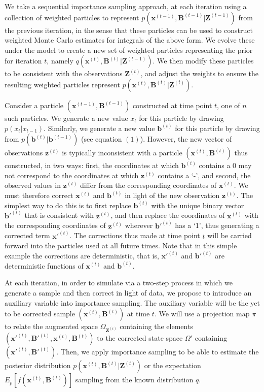 \documentclass[11pt,a4paper]{article}
\renewcommand{\vec}[1]{\mathbf{#1}}
\begin{document}
We take a sequential importance sampling approach, at each iteration using a collection of weighted particles to represent $p(\vec{x}^{(t-1)}, \vec{B}^{(t-1)} | \vec{Z}^{(t-1)})$ from the previous iteration, in the sense that these particles can be used to construct weighted Monte Carlo estimates for integrals of the above form. We evolve these under the model to create a new set of weighted particles representing the prior for iteration $t$, namely $q(\vec{x}^{(t)}, \vec{B}^{(t)} | \vec{Z}^{(t-1)})$. We then modify these particles to be consistent with the observations $\vec{Z}^{(t)}$, and adjust the weights to ensure the resulting weighted particles represent $p(\vec{x}^{(t)}, \vec{B}^{(t)} | \vec{Z}^{(t)})$.

Consider a particle $(\vec{x}^{(t-1)},\vec{B}^{(t-1)})$ constructed at time point $t$, one of $n$ such particles. We generate a new value $x_t$ for this particle by drawing $p(x_t | x_{t-1})$. Similarly, we generate a new value $\vec{b}^{(t)}$ for this particle by drawing from $p(\vec{b}^{(t)} | \vec{b}^{(t-1)})$ (see equation $(1)$). However, the new vector of observations $\vec{z}^{(t)}$ is typically inconsistent with a particle $(\vec{x}^{(t)}, \vec{B}^{(t)})$ thus constructed, in two ways: first, the coordinates at which $\vec{b}^{(t)}$ contains a 0 may not correspond to the coordinates at which $\vec{z}^{(t)}$ contains a `-', and second, the observed values in $\vec{z}^{(t)}$ differ from the corresponding coordinates of $\vec{x}^{(t)}$. We must therefore correct $\vec{x}^{(t)}$ and $\vec{b}^{(t)}$ in light of the new observation $\vec{z}^{(t)}$. The simplest way to do this is to first replace $\vec{b}^{(t)}$ with the unique binary vector $\vec{b'}^{(t)}$ that is consistent with $\vec{z}^{(t)}$, and then replace the coordinates of $\vec{x}^{(t)}$ with the corresponding coordinates of $\vec{z}^{(t)}$ wherever $\vec{b'}^{(t)}$ has a `1', thus generating a corrected term $\vec{x'}^{(t)}$. The corrections thus made at time point $t$ will be carried forward into the particles used at all future times. Note that in this simple example the corrections are deterministic, that is, $\vec{x'}^{(t)}$ and $\vec{b'}^{(t)}$ are deterministic functions of $\vec{x}^{(t)}$ and $\vec{b}^{(t)}$. 

At each iteration, in order to simulate via a two-step process in which we generate a sample and then correct in light of data, we propose to introduce an auxiliary variable into importance sampling. The auxiliary variable will be the yet to be corrected sample $(\vec{x}^{(t)}, \vec{B}^{(t)})$ at time $t$. We will use a projection map $\pi$ to relate the augmented space $\Omega_{\vec{Z}^{(t)}}$ containing the elements $(\vec{x'}^{(t)}, \vec{B'}^{(t)}, \vec{x}^{(t)}, \vec{B}^{(t)})$ to the corrected state space $\Omega'$ containing $(\vec{x'}^{(t)}, \vec{B'}^{(t)})$. Then, we apply importance sampling to be able to estimate the posterior distribution $p(\vec{x}^{(t)}, \vec{B}^{(t)} | \vec{Z}^{(t)})$ or the expectation $E_{p}[f(\vec{x}^{(t)},\vec{B}^{(t)})]$  sampling from the known distribution $q$.
\end{document}

